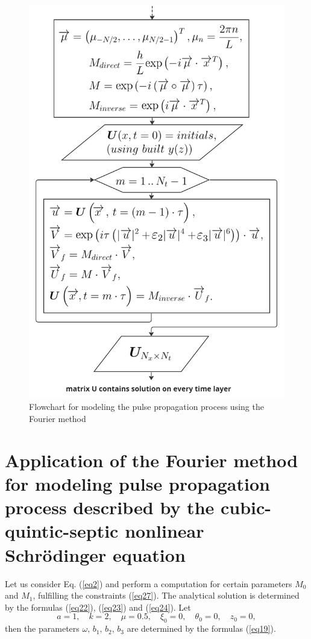 \documentclass[preprint,12pt]{elsarticle}
\begin{document}
\begin{figure}[H]
\begin{center}
\begin{minipage}[h]{0.48\linewidth}
\includegraphics[width=0.85\linewidth]{fig3.png}
\end{minipage}
\end{center}
\caption{Flowchart for modeling the pulse propagation process using the Fourier method}
\label{fig2}
\end{figure}

\section{Application of the Fourier method for modeling pulse propagation process described by the cubic-quintic-septic nonlinear Schr\"{o}dinger equation}\label{ch6}
Let us consider Eq. (\ref{eq2}) and perform a computation for certain parameters \(M_{0}\) and \(M_{1}\), fulfilling the constraints (\ref{eq27}). The analytical solution is determined by the formulas (\ref{eq22}), (\ref{eq23}) and (\ref{eq24}). Let
\begin{equation} 
a=1,\quad
k=2,\quad
\mu=0.5,\quad
\xi_{0}=0,\quad
\theta_{0}=0,\quad
z_{0}=0,
\end{equation}
then the parameters \(\omega,\,b_{1},\,b_{2},\,b_{3}\) are determined by the formulas (\ref{eq19}).
\end{document}
